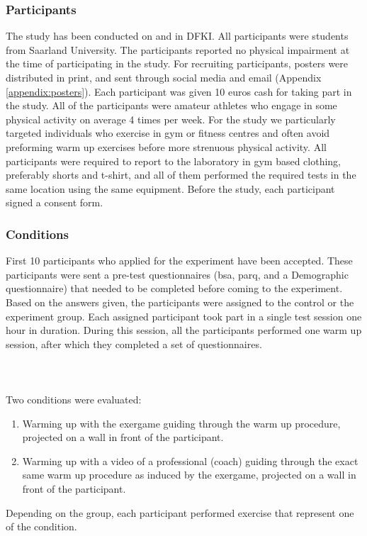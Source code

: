 \subsubsection{Participants}
The study has been conducted on  and  in DFKI. All participants were students from Saarland University. The participants reported no physical impairment at the time of participating in the study. For recruiting participants, posters were distributed in print, and sent through social media and email (Appendix \ref{appendix:posters}). Each participant was given 10 euros cash for taking part in the study. All of the participants were amateur athletes who engage in some physical activity on average 4 times per week. For the study we particularly targeted individuals who exercise in gym or fitness centres and often avoid preforming warm up exercises before more strenuous physical activity. All participants were required to report to the laboratory in gym based clothing, preferably shorts and t-shirt, and all of them performed the required tests in the same location using the same equipment. Before the study, each participant signed a consent form.%
\subsubsection{Conditions}
First 10 participants who applied for the experiment have been accepted. These participants were sent a pre-test questionnaires (\acrshort{bsa}, \acrshort{parq}, and a Demographic questionnaire) that needed to be completed before coming to the experiment. Based on the answers given, the participants were assigned to the control or the experiment group. Each assigned participant took part in a single test session one hour in duration. During this session, all the participants  performed one warm up session, after which they completed a set of questionnaires. \\\\\\\\Two conditions were evaluated:
\begin{enumerate}
\item Warming up with the exergame guiding through the warm up procedure, projected on a wall in front of the participant.
\item Warming up with a video of a professional (coach) guiding through the exact same warm up procedure as induced by the exergame, projected on a wall in front of the participant.
\end{enumerate}
Depending on the group, each participant performed exercise that represent one of the condition.
